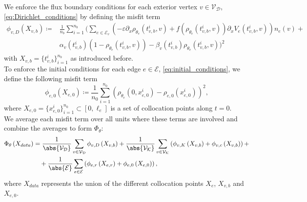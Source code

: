 We enforce the flux boundary conditions for each exterior vertex $v \in \mathcal{V}_\mathcal{D}$, \cref{eq:Dirichlet_conditions} by defining the misfit term  
\begin{align} 
    \label{misfit:Dirichlet}
    \phi_{v,D}  \left( X_{v,b} \right) \coloneqq & \frac{1}{n_b} \sum_{i=1}^{n_b} \bigg( \sum_{e \in \mathcal{E}_v} \left(- \varepsilon \partial_x \rho_{\theta_e}  \left( t_{v,b}^i, v \right) + f\left(\rho_{\theta_e}  \left( t_{v,b}^i, v \right)\right) \partial_x V_e\left( t_{v,b}^i, v \right) \right) n_e  \left( v \right) + \\
    & \alpha_v \left( t_{v,b}^i \right)  \left( 1- \rho_{\theta_e}  \left( t_{v,b}^i, v \right) \right) - \beta_v \left( t_{v,b}^i \right) \rho_{\theta_e}  \left( t_{v,b}^i, v \right) \bigg)^2
\end{align}
with $X_{v,b} = \{t_{v,b}^i\}_{i=1}^{n_b}$ as introduced before. \\
To enforce the initial conditions for each edge $e \in \mathcal{E}$, \cref{eq:initial_conditions}, we define the following misfit term  
\begin{equation} 
    \label{misfit:initial}
    \phi_{e,0}  \left( X_{e,0} \right) \coloneqq \frac{1}{n_0} \sum_{i=1}^{n_0}  \left( \rho_{\theta_e}  \left( 0,x_{e,0}^i \right) - \rho_{e,0} \left( x_{e,0}^i \right) \right)^2, 
\end{equation} 
where $X_{e,0} = \{x_{e,0}^i\}_{i=1}^{n_0} \subset [0, \ell_e]$ is a set of collocation points along $t=0$. \\ 

We average each misfit term over all units where these terms are involved and combine the averages to form $\Phi_\theta$:
\begin{align*} 
    \label{eq:loss}
    \Phi_{\theta} \left( X_{data} \right) & =  \frac{1}{\abs{\mathcal{V}_\mathcal{D}}} \sum_{v \in \mathcal{V}_\mathcal{D}} \phi_{v,D} \left( X_{v,b} \right) + \frac{1}{\abs{\mathcal{V}_\mathcal{K}}} \sum_{v \in \mathcal{V}_\mathcal{K}}  \left(  \phi_{v,K}  \left( X_{v,b} \right) + \phi_{v,c} \left( X_{v,b} \right)  \right) + \\
    & \quad + \frac{1}{\abs{\mathcal{E}}} \sum_{e \in \mathcal{E}}  \left(  \phi_{e,r}  \left( X_{e,r} \right) + \phi_{e,0}  \left( X_{e,0} \right)  \right), 
\end{align*}
where $X_{data}$ represents the union of the different collocation points $X_e$, $X_{v,b}$ and $X_{e,0}$. 







